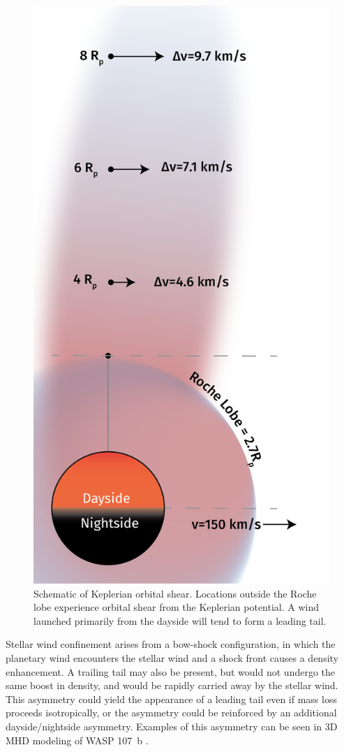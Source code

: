 \documentclass[twocolumn]{aastex631}
\begin{document}
\begin{figure}
    \includegraphics[width=0.8\linewidth]{figures/KeplerianShear_v0p3.png}
    \caption{Schematic of Keplerian orbital shear.  Locations outside the Roche lobe experience orbital shear from the Keplerian potential.  A wind launched primarily from the dayside will tend to form a leading tail.}
    \label{fig:KeplerianShear}
\end{figure}

Stellar wind confinement \citep{2022ApJ...926..226M} arises from a bow-shock configuration, in which the planetary wind encounters the stellar wind and a shock front causes a density enhancement.  A trailing tail may also be present, but would not undergo the same boost in density, and would be rapidly carried away by the stellar wind.  This asymmetry could yield the appearance of a leading tail even if mass loss proceeds isotropically, or the asymmetry could be reinforced by an additional dayside/nightside asymmetry.  Examples of this asymmetry can be seen in 3D MHD modeling of WASP 107~b \citep{2022ApJ...926..226M}.
\end{document}
